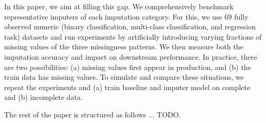 In this paper, we aim at filling this gap. We comprehensively benchmark representative imputers of each imputation category. For this, we use $69$ fully observed numeric (binary classification, multi-class classification, and regression task) datasets and run experiments by artificially introducing varying fractions of missing values of the three missingness patterns. We then measure both the imputation accuracy and impact on downstream performance. In practice, there are two possibilities: (a) missing values first appear in production, and (b) the train data has missing values. To simulate and compare these situations, we repeat the experiments and (a) train baseline and imputer model on complete and (b) incomplete data.

The rest of the paper is structured as follows ... TODO.
